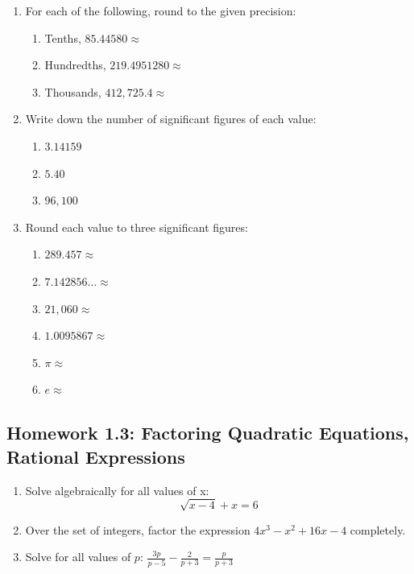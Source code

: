 \documentclass[12pt, oneside]{article}
\begin{document}
\begin{enumerate}
  \item For each of the following, round to the given precision:
  \begin{enumerate}
    \item Tenths, $85.44580 \approx$\\[0.3in]
    \item Hundredths, $219.4951280 \approx$\\[0.3in]
    \item Thousands, $412,725.4 \approx$\\[0.3in]
  \end{enumerate}
  \item Write down the number of significant figures of each value:
  \begin{enumerate}
    \item $3.14159$\\[0.3in]
    \item $5.40$\\[0.3in]
    \item $96,100$\\[0.3in]
  \end{enumerate}
  \item Round each value to three significant figures:
  \begin{enumerate}
    \item $289.457 \approx$\\[0.3in]
    \item $7.142856\ldots \approx$\\[0.3in]
    \item $21,060 \approx$\\[0.3in]
    \item $1.0095867 \approx$\\[0.3in]
    \item $\pi \approx$\\[0.3in]
    \item $e \approx$\\[0.3in]
  \end{enumerate}

\end{enumerate}

\newpage
\subsection*{Homework 1.3: Factoring Quadratic Equations, Rational Expressions}

\begin{enumerate}
\item %
Solve algebraically for all values of x:
\[\sqrt{x-4}+x=6\]

\item %
Over the set of integers, factor the expression $4x^3 - x^2 +16x - 4$ completely.


\item %
Solve for all values of $p$:
$\displaystyle \frac{3p}{p-5}-\frac{2}{p+3}=\frac{p}{p+3}$
\end{enumerate}
\end{document}
